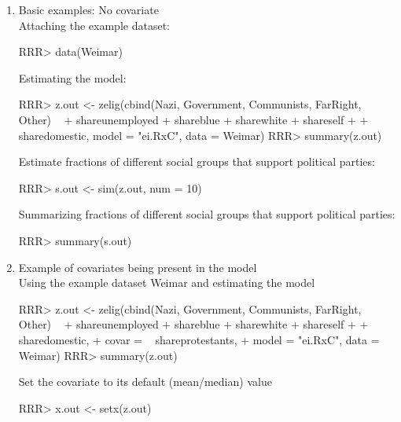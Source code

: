 \begin{enumerate}
 \item Basic examples: No covariate \\
 Attaching the example dataset:
\begin{Schunk}
\begin{Sinput}
RRR>   data(Weimar)
\end{Sinput}
\end{Schunk}
Estimating the model:
\begin{Schunk}
\begin{Sinput}
RRR>  z.out <- zelig(cbind(Nazi, Government, Communists, FarRight, Other) ~  
+                 shareunemployed + shareblue + sharewhite + shareself + 
+                 sharedomestic, model = "ei.RxC", data = Weimar)
RRR>  summary(z.out)
\end{Sinput}
\end{Schunk}

Estimate fractions of different social groups that support political parties:
\begin{Schunk}
\begin{Sinput}
RRR>  s.out <- sim(z.out, num = 10)
\end{Sinput}
\end{Schunk}

Summarizing fractions of different social groups that support political parties:
\begin{Schunk}
\begin{Sinput}
RRR>  summary(s.out)
\end{Sinput}
\end{Schunk}

 \item Example of covariates being present in the model \\

 Using the example dataset Weimar and estimating the model
\begin{Schunk}
\begin{Sinput}
RRR>  z.out <- zelig(cbind(Nazi, Government, Communists, FarRight, Other) ~  
+                 shareunemployed + shareblue + sharewhite + shareself + 
+                 sharedomestic,
+                 covar = ~ shareprotestants, 
+                 model = "ei.RxC", data = Weimar)
RRR>  summary(z.out)
\end{Sinput}
\end{Schunk}

Set the covariate to its default (mean/median) value

\begin{Schunk}
\begin{Sinput}
RRR>  x.out <- setx(z.out)
\end{Sinput}
\end{Schunk}


\end{enumerate}
